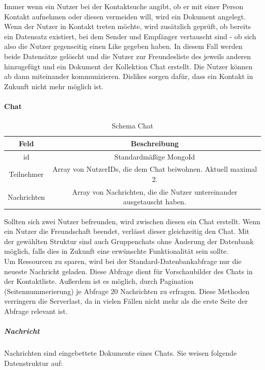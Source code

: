 Immer wenn ein Nutzer bei der Kontaktsuche angibt, ob er mit einer Person Kontakt aufnehmen oder diesen vermeiden will, wird ein Dokument angelegt. 
Wenn der Nutzer in Kontakt treten möchte, wird zusätzlich geprüft, ob bereits ein Datensatz existiert, bei dem Sender und Empfänger vertauscht sind - ob sich also die Nutzer gegenseitig einen Like gegeben haben. 
In diesem Fall werden beide Datensätze gelöscht und die Nutzer zur Freundesliste des jeweils anderen hinzugefügt und ein Dokument der Kollektion Chat erstellt. 
Die Nutzer können ab dann miteinander kommunizieren. 
Dislikes sorgen dafür, dass ein Kontakt in Zukunft nicht mehr möglich ist.

\paragraph{Chat\\}
\begin{table}
    \centering
    \begin{tabular}{ |c|c| }
        \hline
        Feld & Beschreibung  \\
        \hline
        id & Standardmäßige MongoId \\
        Teilnehmer & Array von NutzerIDs, die dem Chat beiwohnen. Aktuell maximal 2. \\
        Nachrichten & Array von Nachrichten, die die Nutzer untereinander ausgetauscht haben. \\
        \hline
    \end{tabular}    
    \caption{Schema Chat}
    \label{db:table:chat}
\end{table}

Sollten sich zwei Nutzer befreunden, wird zwischen diesen ein Chat erstellt.
Wenn ein Nutzer die Freundschaft beendet, verlässt dieser gleichzeitig den Chat. 
Mit der gewählten Struktur sind auch Gruppenchats ohne Änderung der Datenbank möglich, falls dies in Zukunft eine erwünschte Funktionalität sein sollte.\\
Um Ressourcen zu sparen, wird bei der Standard-Datenbankabfrage nur die neueste Nachricht geladen.
Diese Abfrage dient für Vorschaubilder des Chats in der Kontaktliste.
Außerdem ist es möglich, durch Pagination (Seitennummerierung) je Abfrage 20 Nachrichten zu erfragen.
Diese Methoden verringern die Serverlast, da in vielen Fällen nicht mehr als die erste Seite der Abfrage relevant ist.\\

\subparagraph{Nachricht\\}
Nachrichten sind eingebettete Dokumente eines Chats.
Sie weisen folgende Datenstruktur auf:

